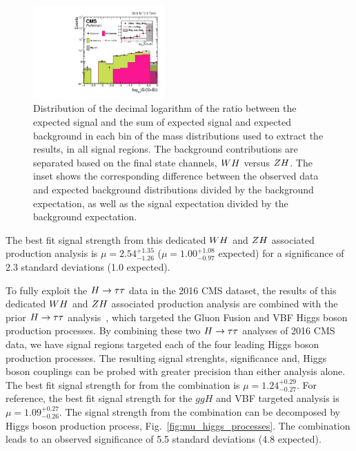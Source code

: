 \begin{figure}[!ht]
 \begin{center}
  \includegraphics[width=0.45\textwidth]{higgs_to_taus_vh/plots/combined/wh_vs_zh_sbweight.pdf}
 \end{center}
 \caption{
 Distribution of the decimal logarithm of the ratio between the expected signal and the 
 sum of expected signal and expected background in each bin of the mass distributions 
 used to extract the results, in all signal regions. The background contributions are 
 separated based on the final state channels, $WH$ versus $ZH$. The inset 
 shows the corresponding difference between the 
 observed data and expected background distributions divided by the background expectation, 
 as well as the signal expectation divided by the background expectation.
 }
 \label{fig:sb}
\end{figure}



The best fit signal
strength from this dedicated $WH$ and $ZH$ associated production analysis is 
$\mu = 2.54 ^{+1.35} _{-1.26}$ ($\mu = 1.00 ^{+1.08} _{-0.97}$ expected) 
for a significance of 2.3 standard deviations (1.0 expected).

To fully exploit the $H \to \tau\tau$ data in the 2016 CMS dataset, the results
of this dedicated $WH$ and $ZH$ associated production analysis are combined with the prior
$H \to \tau\tau$ analysis~\cite{HIG-16-043}, which targeted the Gluon Fusion and
VBF Higgs boson production processes. 
By combining these two $H\to\tau\tau$ analyses of
2016 CMS data, we have signal regions targeted each of the four leading Higgs 
boson production processes. The resulting signal strenghts, significance and, Higgs
boson couplings can be probed with greater precision than either analysis alone.
The best fit signal strength for from the combination is $\mu = 1.24 ^{+0.29} _{-0.27}$.
For reference, the best fit signal strength for the $ggH$ and VBF targeted analysis
is $\mu = 1.09 ^{+0.27} _{-0.26}$.
The signal strength from the combination can be decomposed by Higgs boson production 
process, Fig.~\ref{fig:mu_higgs_processes}. The combination leads to an 
observed significance of 5.5 standard deviations (4.8 expected). 

